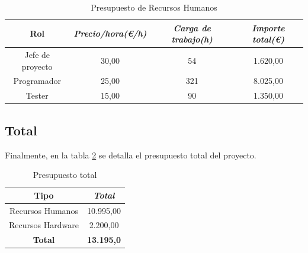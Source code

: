 			\begin{table}[htp]
				\centering
				\caption{Presupuesto de Recursos Humanos}\label{tab:budget-human}
				\begin{tabular}{cccc}
					\toprule
			    	\textbf{Rol} & \emph{Precio/hora(\euro/h)} & \emph{Carga de trabajo(h)} & \emph{Importe total(\euro)}\\
			    	\midrule
			    	Jefe de proyecto				&	30,00			&	54 					& 	1.620,00\\
					Programador						&	25,00			&	321					&	8.025,00\\
					Tester							&	15,00			&	90					&	1.350,00\\
			    	\bottomrule
			    \end{tabular}
			\end{table}

		\subsection{Total}

			Finalmente, en la tabla \ref{tab:total-budget} se detalla el presupuesto total del proyecto.

			\begin{table}[htp]
				\centering
				\caption{Presupuesto total}\label{tab:total-budget}
				\begin{tabular}{cc}
					\toprule
			    	\textbf{Tipo} 		& 	\emph{Total}\\
			    	\midrule
			    	Recursos Humanos	& 			10.995,00\\
					Recursos Hardware	&			2.200,00\\
					\textbf{Total}		&	\textbf{13.195,0}\\
			    	\bottomrule
			    \end{tabular}
			\end{table}
